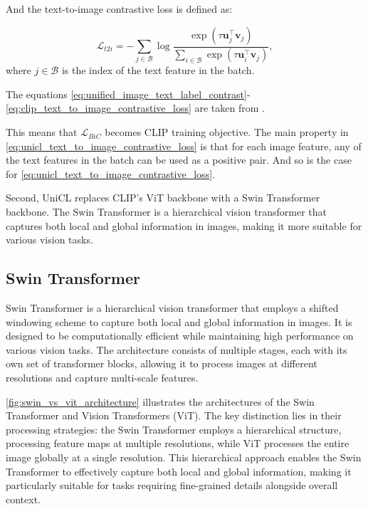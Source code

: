 And the text-to-image contrastive loss is defined as:

\begin{equation} \label{eq:clip_text_to_image_contrastive_loss}
    \mathcal{L}_{t2i} = - \sum_{j \in \mathcal{B}} 
    \log \frac{\exp(\tau \mathbf{u}_j^\top \mathbf{v}_j)}{\sum_{i \in \mathcal{B}} \exp(\tau \mathbf{u}_i^\top \mathbf{v}_j)},
\end{equation}
where $j \in \mathcal{B}$ is the index of the text feature in the batch. 

The equations \ref{eq:unified_image_text_label_contrast}-\ref{eq:clip_text_to_image_contrastive_loss} are taken from \cite{vl_unicl}.

This means that $\mathcal{L}_{BiC}$ becomes CLIP training objective. The main property in \autoref{eq:unicl_text_to_image_contrastive_loss} is that for each image feature, any of the text features in the batch can be used as a positive pair. And so is the case for \autoref{eq:unicl_text_to_image_contrastive_loss}.

Second, UniCL replaces CLIP's ViT backbone with a Swin Transformer backbone. The Swin Transformer is a hierarchical vision transformer that captures both local and global information in images, making it more suitable for various vision tasks.

\subsection{Swin Transformer}
\label{subsec:swin_transformer}
Swin Transformer is a hierarchical vision transformer that employs a shifted windowing scheme to capture both local and global information in images. It is designed to be computationally efficient while maintaining high performance on various vision tasks. The architecture consists of multiple stages, each with its own set of transformer blocks, allowing it to process images at different resolutions and capture multi-scale features.

\autoref{fig:swin_vs_vit_architecture} illustrates the architectures of the Swin Transformer and Vision Transformers (ViT). The key distinction lies in their processing strategies: the Swin Transformer employs a hierarchical structure, processing feature maps at multiple resolutions, while ViT processes the entire image globally at a single resolution. This hierarchical approach enables the Swin Transformer to effectively capture both local and global information, making it particularly suitable for tasks requiring fine-grained details alongside overall context.

